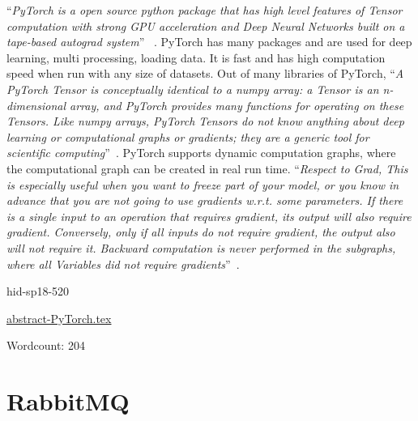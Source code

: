 \color{blue}``\emph{PyTorch is a open source python package that has high level features of 
Tensor computation with strong GPU acceleration and Deep 
Neural Networks built on a tape-based autograd system}''\color{black}
~\cite{hid-sp18-520-PyTorch}.
PyTorch has many packages and are used for deep learning, multi processing,
loading data. It is fast and has high computation speed when run with any size 
of datasets.
Out of many libraries of PyTorch, \color{blue}``\emph{A PyTorch Tensor is conceptually identical 
to a numpy array: a Tensor is an n-dimensional array, and PyTorch provides many
functions for operating on these Tensors. Like numpy arrays, PyTorch Tensors do 
not know anything about deep learning or computational graphs or gradients; they
are a generic tool for scientific computing}''\color{black}~\cite{hid-sp18-520-PyTorchtensor}.
PyTorch supports dynamic computation graphs, where the computational graph can 
be created in real run time.
\color{blue}``\emph{Respect to Grad, This is especially useful when you want to freeze part of your
model, or you know in advance that you are not going to use gradients w.r.t. 
some parameters. If there is a single input to an operation that requires 
gradient, its output will also require gradient. Conversely, only if all inputs 
do not require gradient, the output also will not require it. Backward 
computation is never performed in the subgraphs, where all Variables did not 
require gradients}''\color{black}~\cite{hid-sp18-520-PyTorchgrad}.


\begin{IU}

hid-sp18-520

\href{https://github.com/cloudmesh-community/hid-sp18-520/blob/master//technology/abstract-PyTorch.tex}{abstract-PyTorch.tex}

 

Wordcount: 204

\end{IU}

\section{RabbitMQ}

